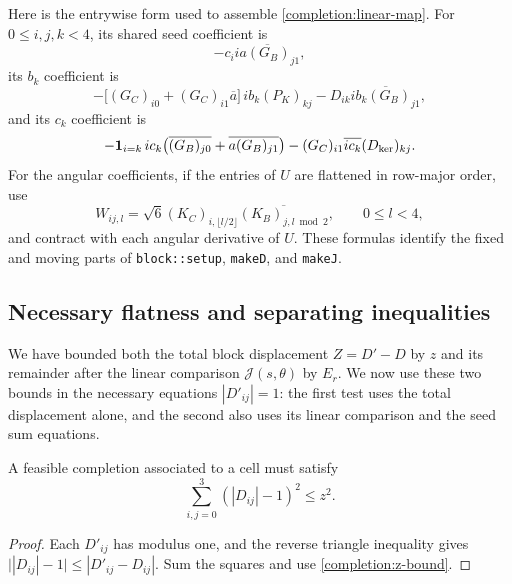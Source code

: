 Here is the entrywise form used to assemble \eqref{completion:linear-map}.
For $0\le i,j,k<4$, its shared seed coefficient is
\[
 -c_i\overline{i a(G_B)_{j1}},
\]
its $b_k$ coefficient is
\[
 -\big[(G_C)_{i0}+(G_C)_{i1}\overline a\big]\,
       i b_k(P_K)_{kj}
 -D_{ik}\overline{i b_k(G_B)_{j1}},
\]
and its $c_k$ coefficient is
\[
 -\mathbf 1_{i=k}\,i c_k
       \big(\overline{(G_B)_{j0}}+\overline{a(G_B)_{j1}}\big)
 -(G_C)_{i1}\overline{i c_k}(D_{\rm ker})_{kj}.
\]
For the angular coefficients, if the entries of $U$ are flattened in
row-major order, use
\[
 W_{ij,l}=\sqrt6(K_C)_{i,\lfloor l/2\rfloor}
                 \overline{(K_B)_{j,l\bmod2}},\qquad 0\le l<4,
\]
and contract with each angular derivative of $U$.
These formulas identify the fixed and moving parts of
\texttt{block::setup}, \texttt{makeD}, and \texttt{makeJ}.

\subsection{Necessary flatness and separating inequalities}

We have bounded both the total block displacement $Z=D'-D$ by $z$ and
its remainder after the linear comparison $\mathcal J(s,\theta)$ by
$E_r$.  We now use these two bounds in the necessary equations
$|D'_{ij}|=1$: the first test uses the total displacement alone, and the
second also uses its linear comparison and the seed sum equations.

\begin{lemma}
\label{completion:norm-exclusion}
A feasible completion associated to a cell must satisfy
\begin{equation}
\label{completion:norm-test}
 \sum_{i,j=0}^3(|D_{ij}|-1)^2\le z^2.
\end{equation}
\end{lemma}

\begin{proof}
Each $D'_{ij}$ has modulus one, and the reverse triangle inequality gives
$\big||D_{ij}|-1\big|\le|D'_{ij}-D_{ij}|$.
Sum the squares and use \eqref{completion:z-bound}.
\end{proof}

